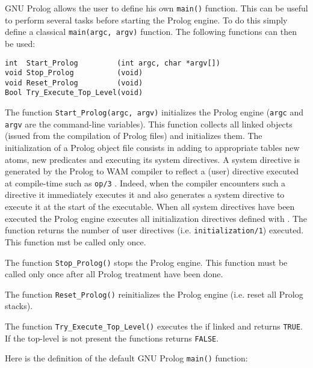 GNU Prolog allows the user to define his own \texttt{main()}
function. This can be useful to perform several tasks before starting
the Prolog engine. To do this simply define a classical
\texttt{main(argc, argv)} function. The following functions can then be used:

\begin{Indentation}
\begin{verbatim}
int  Start_Prolog         (int argc, char *argv[])
void Stop_Prolog          (void)
void Reset_Prolog         (void)
Bool Try_Execute_Top_Level(void)
\end{verbatim}
\end{Indentation}

The function \texttt{Start\_Prolog(argc, argv)} initializes the Prolog engine
(\texttt{argc} and \texttt{argv} are the command-line variables). This
function collects all linked objects (issued from the compilation of Prolog
files) and initializes them. The initialization of a Prolog object file
consists in adding to appropriate tables new atoms, new predicates and
executing its system directives. A system directive is generated by the
Prolog to WAM compiler to reflect a (user) directive executed at compile-time
such as \texttt{op/3} . Indeed, when the compiler encounters
such a directive it immediately executes it and also generates a system
directive to execute it at the start of the executable.  When all system
directives have been executed the Prolog engine executes all initialization
directives defined with 
. The function returns the number of user
directives (i.e. \texttt{initialization/1}) executed. This function mst be
called only once.

The function \texttt{Stop\_Prolog()} stops the Prolog engine. This function
must be called only once after all Prolog treatment have been done.

The function \texttt{Reset\_Prolog()} reinitializes the Prolog engine
(i.e. reset all Prolog stacks).

The function \texttt{Try\_Execute\_Top\_Level()} executes the
 if linked  and returns
\texttt{TRUE}. If the top-level is not present the functions returns
\texttt{FALSE}.

Here is the definition of the default GNU Prolog \texttt{main()} function:

